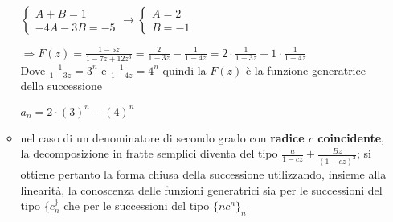 \begin{flushleft}
\begin{itemize}[nosep]
\begin{itemize}[nosep]
\begin{boxA}
                {\centering
                    $\begin{cases}
                        A + B = 1 \\
                        -4A -3B = - 5
                    \end{cases}
                    \rightarrow
                    \begin{cases}
                        A = 2 \\
                        B = -1
                    \end{cases}$
                \par}
                $\Rightarrow F(z) = \frac{1-5z}{1-7z+12z^3} = \frac{2}{1-3z} - \frac{1}{1-4z} = 2 \cdot \frac{1}{1-3z} - 1 \cdot \frac{1}{1-4z}$ \\
                Dove $\frac{1}{1-3z} = 3^n$ e $\frac{1}{1-4z} = 4^n$ quindi la $F(z)$ è la funzione generatrice della successione 
                
                {\centering
                    $a_n = 2 \cdot (3)^n - (4)^n$
                \par}
            \end{boxA}
            \item nel caso di un denominatore di secondo grado con \textbf{radice $c$ coincidente}, la decomposizione in fratte semplici diventa del tipo $\frac{a}{1-cz} + \frac{Bz}{(1-cz)^2}$; si ottiene pertanto la forma chiusa della successione utilizzando, insieme alla linearità, la conoscenza delle funzioni generatrici sia per le successioni del tipo $\{c^\}_n$ che per le successioni del tipo $\{nc^n\}_n$
        \end{itemize}
    \end{itemize}
\end{flushleft}